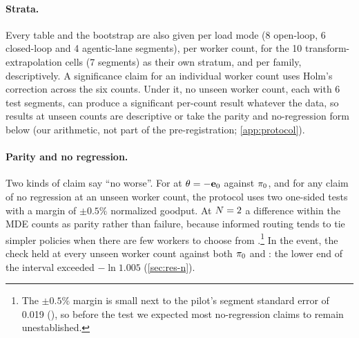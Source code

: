 \paragraph{Strata.} Every table and the bootstrap are also given per load mode (8 open-loop, 6
closed-loop and 4 agentic-lane segments), per worker count, for the 10 transform-extrapolation
cells (7 segments) as their own stratum, and per family, descriptively. A significance claim for
an individual worker count uses Holm's correction across the six counts.
Under it, no unseen worker count, each with 6 test segments, can produce a significant per-count
result whatever the data, so results at unseen counts are descriptive or take the parity and
no-regression form below (our arithmetic, not part of the pre-registration; \cref{app:protocol}).

\paragraph{Parity and no regression.}
Two kinds of claim say ``no worse''. For \lc{} at $\theta = -\mathbf{e}_{0}$ against $\pi_{0}$, and for
any claim of no regression at an unseen worker count, the protocol uses two one-sided tests with a
margin of $\pm 0.5\%$ normalized goodput. At $N = 2$ a difference within the MDE counts as
parity rather than failure, because informed routing tends to tie simpler policies when there are
few workers to choose from \citep{tumkur2026calibrate}.\footnote{The $\pm 0.5\%$ margin is small
  next to the pilot's segment standard error of 0.019 (\prelim), so before the test we expected most
  no-regression claims to remain unestablished.}
In the event, the check held at every unseen worker count against both $\pi_{0}$ and
: the lower end of the interval exceeded $-\ln 1.005$ (\cref{sec:res-n}).

